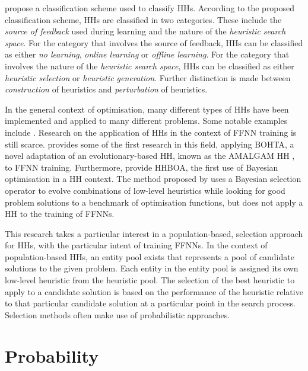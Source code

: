 \documentclass[preprint,review,12pt]{elsarticle}
\begin{document}
\citet{ref:burke:2010} propose a classification scheme used to classify \acp{HH}. According to the proposed classification scheme, \acp{HH} are classified in two categories. These include the \textit{source of feedback} used during learning and the nature of the \textit{heuristic search space}. For the category that involves the source of feedback, \acp{HH} can be classified as either \textit{no learning}, \textit{online learning} or \textit{offline learning}. For the category that involves the nature of the \textit{heuristic search space}, \acp{HH} can be classified as either \textit{heuristic selection} or \textit{heuristic generation}. Further distinction is made between \textit{construction} of heuristics and \textit{perturbation} of heuristics.

In the general context of optimisation, many different types of \acp{HH} have been implemented and applied to many different problems. Some notable examples include \citep{ref:burke:2010, ref:grobler:2012, ref:vanderstockt:2018}. Research on the application of \acp{HH} in the context of \acs{FFNN} training is still scarce. \citet{ref:nel:2021} provides some of the first research in this field, applying \acs{BOHTA}, a novel adaptation of an evolutionary-based \acs{HH}, known as the \acs{AMALGAM} \acs{HH} \citep{ref:vrugt:2007}, to \acs{FFNN} training. Furthermore, \citet{ref:oliva:2019} provide \acs{HHBOA}, the first use of Bayesian optimisation in a \acs{HH} context. The method proposed by \citet{ref:oliva:2019} uses a Bayesian selection operator to evolve combinations of low-level heuristics  while looking for good problem solutions to a benchmark of optimisation functions, but does not apply a \acs{HH} to the training of \acp{FFNN}.

This research takes a particular interest in a population-based, selection approach for \acp{HH}, with the particular intent of training \acp{FFNN}. In the context of population-based \acp{HH}, an entity pool exists that represents a pool of candidate solutions to the given problem. Each entity in the entity pool is assigned its own low-level heuristic from the heuristic pool. The selection of the best heuristic to apply to a candidate solution is based on the performance of the heuristic relative to that particular candidate solution at a particular point in the search process. Selection methods often make use of probabilistic approaches.


\section{Probability}
\label{sec:probability}
\end{document}
